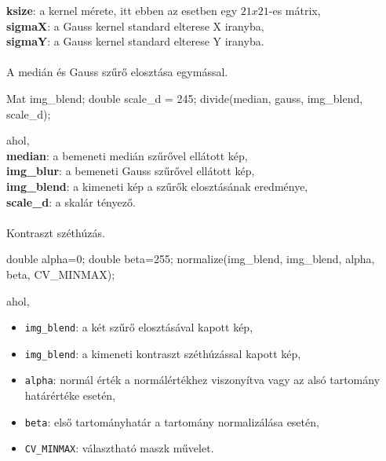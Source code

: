 \indent \textbf{ksize}: a kernel mérete, itt ebben az esetben egy $21 x 21$-es mátrix,\\
\indent \textbf{sigmaX}: a Gauss kernel standard elterese X iranyba,\\
\indent \textbf{sigmaY}: a Gauss kernel standard elterese Y iranyba.\\ \\
A medián és Gauss szűrő elosztása egymással.
\begin{cpp}
Mat img_blend;
double scale_d = 245;
divide(median, gauss, img_blend, scale_d);   
\end{cpp}
ahol, \\
\indent \textbf{median}: a bemeneti medián szűrővel ellátott kép,\\
\indent \textbf{img\_blur}: a bemeneti Gauss szűrővel ellátott kép,\\
\indent \textbf{img\_blend}: a kimeneti kép a szűrők elosztásának eredménye,\\
\indent \textbf{scale\_d}: a skalár tényező.\\ \\
Kontraszt széthúzás.
\begin{cpp}
double alpha=0; 
double beta=255;
normalize(img_blend, img_blend, alpha, beta, CV_MINMAX);
\end{cpp}
ahol,
\begin{itemize}
\item \texttt{img\_blend}: a két szűrő elosztásával kapott kép,
\item \texttt{img\_blend}: a kimeneti kontraszt széthúzással kapott kép,
\item \texttt{alpha}: normál érték a normálértékhez viszonyítva vagy az alsó tartomány határértéke esetén,
\item \texttt{beta}: első tartományhatár a tartomány normalizálása esetén,
\item \texttt{CV\_MINMAX}: választható maszk művelet.
\end{itemize}


